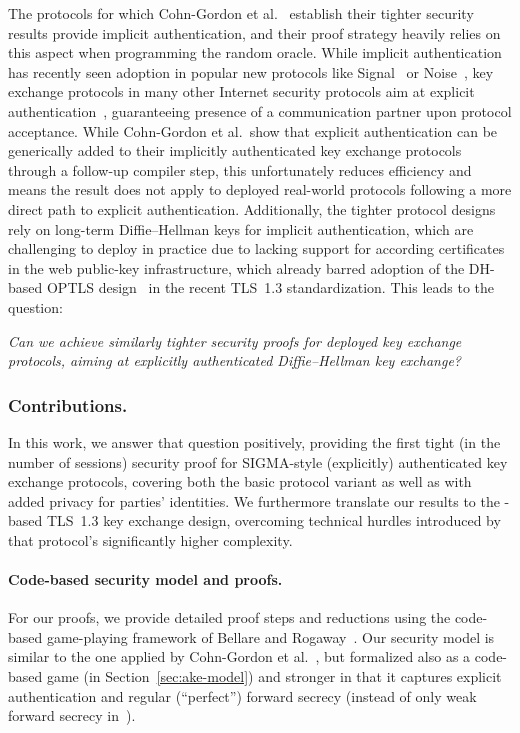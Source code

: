 The protocols for which Cohn-Gordon et al.~\cite{C:CCGJJ19} establish their tighter security results provide implicit authentication, and their proof strategy heavily relies on this aspect when programming the random oracle.
While implicit authentication has recently seen adoption in popular new protocols like Signal~\cite{Signal} or Noise~\cite{Noise},
key exchange protocols in many other Internet security protocols aim at explicit authentication~\cite{C:BelRog93}, guaranteeing presence of a communication partner upon protocol acceptance.
While Cohn-Gordon et al.\ show that explicit authentication can be generically added to their implicitly authenticated key exchange protocols through a follow-up compiler step, this unfortunately reduces efficiency and means the result does not apply to deployed real-world protocols following a more direct path to explicit authentication.
Additionally, the tighter protocol designs rely on long-term Diffie--Hellman keys for implicit authentication, which are challenging to deploy in practice due to lacking support for according certificates in the web public-key infrastructure, which already barred adoption of the DH-based OPTLS design~\cite{EuroSP:KraWee16} in the recent TLS~1.3 standardization.
This leads to the question:
\begin{center}
	\emph{Can we achieve similarly tighter security proofs for deployed key exchange protocols,
	aiming at explicitly authenticated Diffie--Hellman key exchange?}
\end{center}


\subsubsection*{Contributions.}
In this work, we answer that question positively, providing the first tight (in the number of sessions) security proof for SIGMA-style (explicitly) authenticated key exchange protocols, covering both the basic protocol variant as well as \SIGMAI with added privacy for parties' identities.
We furthermore translate our results to the \SIGMA-based TLS~1.3 key exchange design, overcoming technical hurdles introduced by that protocol's significantly higher complexity.


\paragraph{Code-based security model and proofs.}
For our proofs, we provide detailed proof steps and reductions using the code-based game-playing framework of Bellare and Rogaway~\cite{EC:BelRog06}.
Our security model is similar to the one applied by Cohn-Gordon et al.~\cite{C:CCGJJ19},
but formalized also as a code-based game (in Section~\ref{sec:ake-model}) and stronger in that it captures explicit authentication and regular (``perfect'') forward secrecy (instead of only weak forward secrecy in~\cite{C:CCGJJ19}).



